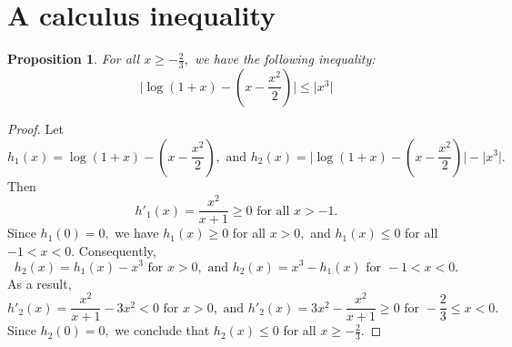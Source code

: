 \documentclass[11pt,onecolumn]{IEEEtran}
\newtheorem{proposition}[theorem]{Proposition}
\begin{document}
\appendices
{}

\section{A calculus inequality}\label{ap:log}
\begin{proposition}\label{Prop:log}
For all $x\ge -\frac{2}{3},$ we have the following inequality:
$$
\Big| \log(1+x) - (x - \frac{x^2}{2}) \Big| \le \Big| x^3 \Big|
$$
\end{proposition}
\begin{proof}
Let 
$$
h_1(x)=\log(1+x) - (x - \frac{x^2}{2}), \text{~and~} 
h_2(x) = \Big| \log(1+x) - (x - \frac{x^2}{2}) \Big| - \Big| x^3 \Big|.
$$
Then
$$
h'_1(x)=\frac{x^2}{x+1} \ge 0 \text{~for all~} x>-1.
$$
Since $h_1(0)=0,$ we have $h_1(x)\ge 0$ for all $x>0,$ and $h_1(x) \le 0$ for all $-1<x<0.$
Consequently,
$$
h_2(x)=h_1(x)-x^3 \text{~for~} x > 0, \text{~and~} h_2(x)=x^3-h_1(x) \text{~for~} -1 < x<0.
$$
As a result,
$$
h'_2(x)=\frac{x^2}{x+1}- 3x^2 < 0 \text{~for~} x > 0, \text{~and~} h'_2(x)=3x^2 - \frac{x^2}{x+1} \ge 0 \text{~for~} -\frac{2}{3} \le x<0.
$$
Since $h_2(0)=0,$ we conclude that $h_2(x) \le 0$ for all $x\ge -\frac{2}{3}.$ 
\end{proof}
\end{document}
